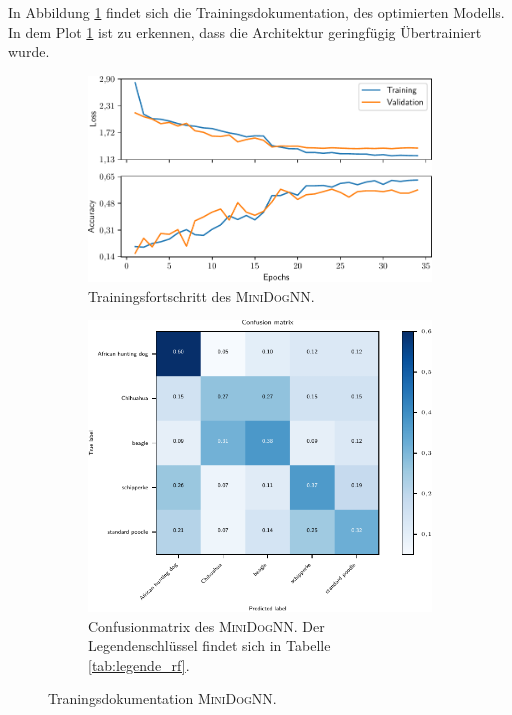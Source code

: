 In Abbildung \ref{fig:MiniDogNN_Loss_Acc} findet sich die Trainingsdokumentation,
des optimierten Modells. In dem Plot \ref{fig:MiniDogNN_Loss_Acc} ist zu erkennen,
dass die Architektur geringfügig Übertrainiert wurde.
\begin{figure}
\centering
\begin{subfigure}{0.48\textwidth}
\centering
\includegraphics[width = \textwidth]{../../final_data/MiniNN_n5/history.pdf}
\caption{Trainingsfortschritt des \textsc{MiniDogNN}.}
\label{fig:MiniDogNN_Loss_Acc}
\end{subfigure}
\begin{subfigure}{0.48\textwidth}
\centering
\includegraphics[width = \textwidth]{../../final_data/MiniNN_n5/confusion_matrix.pdf}
\caption{Confusionmatrix des \textsc{MiniDogNN}. Der Legendenschlüssel findet sich in
Tabelle \ref{tab:legende_rf}.}
\label{fig:MiniDogNN_Confusionmatrix}
\end{subfigure}
\caption{Traningsdokumentation \textsc{MiniDogNN}.}
\end{figure}

